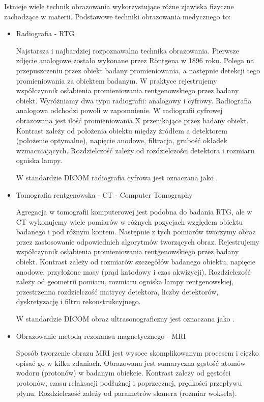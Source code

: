 Istnieje wiele technik obrazowania wykorzystujące różne zjawiska fizyczne zachodzące w materii.
Podstawowe techniki obrazowania medycznego to:
\begin{itemize}
    \item Radiografia - RTG

    Najstarsza i najbardziej rozpoznawalna technika obrazowania.
    Pierwsze zdjęcie analogowe zostało wykonane przez Röntgena w 1896 roku.
    Polega na przepuszczeniu przez obiekt badany promieniowania, a następnie detekcji tego promieniowania za obiektem badanym.
    W praktyce rejestrujemy współczynnik osłabienia promieniowania rentgenowskiego przez badany obiekt.
    Wyróżniamy dwa typu radiografii: analogowy i cyfrowy.
    Radiografia analogowa odchodzi powoli w zapomnienie.
    W radiografii cyfrowej obrazowana jest ilość promieniowania X przenikające przez badany obiekt.
    Kontrast zależy od położenia obiektu między źródłem a detektorem (położenie optymalne), napięcie anodowe, filtracja, grubość okładek wzmacniających.
    Rozdzielczość zależy od rozdzielczości detektora i rozmiaru ogniska lampy.

    W standardzie DICOM radiografia cyfrowa jest oznaczana jako .

    \item Tomografia rentgenowska - CT - Computer Tomography
    
    Agregacja w tomografii komputerowej jest podobna do badania RTG, ale w CT wykonujemy wiele pomiarów w różnych pozycjach względem obiektu badanego i pod różnym kontem.
    Następnie z tych pomiarów tworzymy obraz przez zastosowanie odpowiednich algorytmów tworzących obraz.
    Rejestrujemy współczynnik osłabienia promieniowania rentgenowskiego przez badany obiekt.
    Kontrast zależy od rozmiarów szczegółów badanego obiektu, napięcie anodowe, przyłożone masy (prąd katodowy i czas akwizycji).
    Rozdzielczość zależy od geometrii pomiaru, rozmiaru ogniska lampy rentgenowskiej, przestrzenna rozdzielczość matrycy detektora, liczby detektorów, dyskretyzację i filtru rekonstrukcyjnego.

    W standardzie DICOM obraz ultrasonograficzny jest oznaczana jako .

    \item Obrazowanie metodą rezonansu magnetycznego - MRI

    Sposób tworzenie obrazu MRI jest wysoce skomplikowanym procesem i ciężko opisać go w kilku zdaniach.
    Obrazowana jest sumaryczna gęstość atomów wodoru (protonów) w badanym obiekcie.
    Kontrast zależy od gęstości protonów, czasu relaksacji podłużnej i poprzecznej, prędkości przepływu płynu.
    Rozdzielczość zależy od parametrów skanera (rozmiar woksela).
    

\end{itemize}
